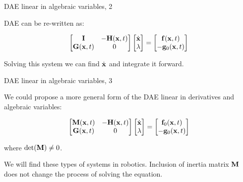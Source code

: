 \documentclass{beamer}
\begin{document}
\begin{frame}{DAE linear in algebraic variables, 2}
	\begin{flushleft}
		
		DAE can be re-written as:
		
		\begin{equation}
			\begin{bmatrix}
				\mathbf{I} & -\mathbf{H}(\mathbf{x}, t) \\
				\mathbf{G}(\mathbf{x}, t) & 0
			\end{bmatrix}
		\begin{bmatrix}
			\dot{\mathbf{x}} \\ \lambda
		\end{bmatrix}
		=
		\begin{bmatrix}
			\mathbf{f}(\mathbf{x}, t) \\
			-\mathbf{g}_0(\mathbf{x}, t)
		\end{bmatrix}
		\end{equation}
		
		Solving this system we can find $\dot{\mathbf{x}}$ and integrate it forward.
		
	\end{flushleft}
\end{frame}



\begin{frame}{DAE linear in algebraic variables, 3}
	\begin{flushleft}
		
		We could propose a more general form of the DAE linear in derivatives and algebraic variables:
		
		\begin{equation}
			\begin{bmatrix}
				\mathbf{M}(\mathbf{x}, t) & -\mathbf{H}(\mathbf{x}, t) \\
				\mathbf{G}(\mathbf{x}, t) & 0
			\end{bmatrix}
			\begin{bmatrix}
				\dot{\mathbf{x}} \\ \lambda
			\end{bmatrix}
			=
			\begin{bmatrix}
				\mathbf{f}_0(\mathbf{x}, t) \\
				-\mathbf{g}_0(\mathbf{x}, t)
			\end{bmatrix}
		\end{equation}
		
		where $\text{det} (\mathbf{M}) \neq 0$. 
		
		\bigskip
		
		We will find these types of systems in robotics. Inclusion of inertia matrix $\mathbf{M}$ does not change the process of solving the equation.
		
	\end{flushleft}
\end{frame}


\myqrframe
\end{document}
